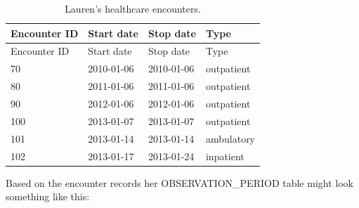 \documentclass[11pt]{book}
\theoremstyle{definition}
\theoremstyle{definition}
\theoremstyle{definition}
\theoremstyle{remark}
\begin{document}
\begin{longtable}[]{@{}llll@{}}
\caption{\label{tab:encounters} Lauren's healthcare encounters.}\tabularnewline
\toprule
Encounter ID & Start date & Stop date & Type\tabularnewline
\midrule
\endfirsthead
\toprule
Encounter ID & Start date & Stop date & Type\tabularnewline
\midrule
\endhead
70 & 2010-01-06 & 2010-01-06 & outpatient\tabularnewline
80 & 2011-01-06 & 2011-01-06 & outpatient\tabularnewline
90 & 2012-01-06 & 2012-01-06 & outpatient\tabularnewline
100 & 2013-01-07 & 2013-01-07 & outpatient\tabularnewline
101 & 2013-01-14 & 2013-01-14 & ambulatory\tabularnewline
102 & 2013-01-17 & 2013-01-24 & inpatient\tabularnewline
\bottomrule
\end{longtable}

Based on the encounter records her OBSERVATION\_PERIOD table might look something like this:
\end{document}

